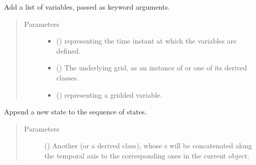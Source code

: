 \documentclass[letterpaper,10pt,english]{sphinxmanual}
\begin{document}
\begin{fulllineitems}
\begin{fulllineitems}
\begin{quote}
\begin{description}
\begin{itemize}
\end{itemize}

\end{description}\end{quote}

\end{fulllineitems}


\begin{fulllineitems}
\label{\detokenize{api:storages.grid_data.GridData.add}}
Add a list of variables, passed as keyword arguments.
\begin{quote}\begin{description}
\item[{Parameters}] \leavevmode\begin{itemize}
\item {} 
 () \textendash{}  representing the time instant at which the variables are defined.

\item {} 
 () \textendash{} The underlying grid, as an instance of {\hyperref[\detokenize{api:grids.grid_xyz.GridXYZ}]{}} or one of its derived classes.

\item {} 
 () \textendash{}  representing a gridded variable.

\end{itemize}

\end{description}\end{quote}

\end{fulllineitems}


\begin{fulllineitems}
\label{\detokenize{api:storages.grid_data.GridData.append}}
Append a new state to the sequence of states.
\begin{quote}\begin{description}
\item[{Parameters}] \leavevmode
{} () \textendash{} Another {\hyperref[\detokenize{api:storages.grid_data.GridData}]{}} (or a derived class), whose s
will be concatenated along the temporal axis to the corresponding ones in the current object.


\end{description}
\end{quote}
\end{fulllineitems}
\end{fulllineitems}
\end{document}

